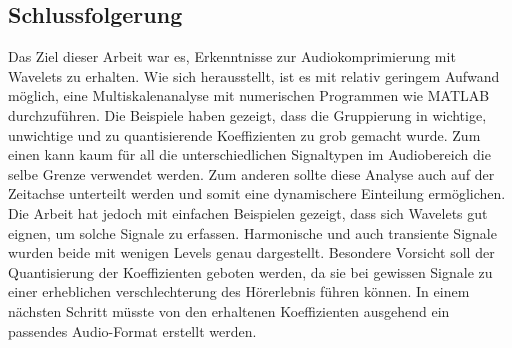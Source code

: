 \begin{refsection}
\section{Schlussfolgerung}
Das Ziel dieser Arbeit war es, Erkenntnisse zur Audiokomprimierung mit Wavelets zu erhalten.
Wie sich herausstellt, ist es mit relativ geringem Aufwand möglich, eine Multiskalenanalyse mit numerischen Programmen wie MATLAB durchzuführen.
Die Beispiele haben gezeigt, dass die Gruppierung in wichtige, unwichtige und zu quantisierende Koeffizienten zu grob gemacht wurde. 
Zum einen kann kaum für all die unterschiedlichen Signaltypen im Audiobereich die selbe Grenze verwendet werden. 
Zum anderen sollte diese Analyse auch auf der Zeitachse unterteilt werden und somit eine dynamischere Einteilung ermöglichen. 
Die Arbeit hat jedoch mit einfachen Beispielen gezeigt, dass sich Wavelets gut eignen, um solche Signale zu erfassen.
Harmonische und auch transiente Signale wurden beide mit wenigen Levels genau dargestellt.
Besondere Vorsicht soll der Quantisierung der Koeffizienten geboten werden, da sie bei gewissen Signale zu einer erheblichen verschlechterung des Hörerlebnis führen können.
In einem nächsten Schritt müsste von den erhaltenen Koeffizienten ausgehend ein passendes Audio-Format erstellt werden.

\printbibliography[heading=subbibliography]
\end{refsection}
